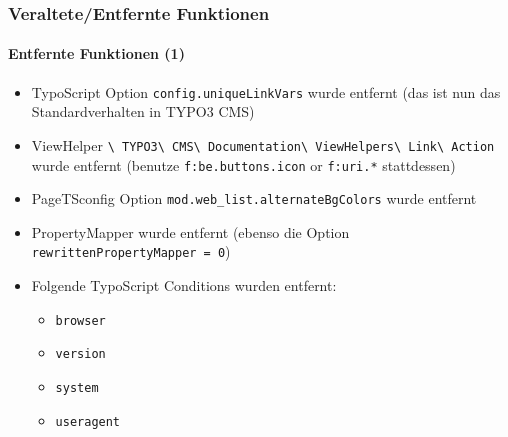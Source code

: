 \begin{frame}[fragile]
	\frametitle{Veraltete/Entfernte Funktionen}
	\framesubtitle{Entfernte Funktionen (1)}

	\begin{itemize}

		\item
			\small
				TypoScript Option \texttt{config.uniqueLinkVars} wurde entfernt\newline
				(das ist nun das Standardverhalten in TYPO3 CMS)
			\normalsize

		\item
			\small
				ViewHelper
					\texttt{\textbackslash
						TYPO3\textbackslash
						CMS\textbackslash
						Documentation\textbackslash
						ViewHelpers\textbackslash
						Link\textbackslash
						Action}
					wurde entfernt (benutze \texttt{f:be.buttons.icon} or \texttt{f:uri.*} stattdessen)
			\normalsize

		\item
			\small
				PageTSconfig Option \texttt{mod.web\_list.alternateBgColors}\newline
				wurde entfernt
			\normalsize

		\item
			\small
				PropertyMapper wurde entfernt\newline
				(ebenso die Option \texttt{rewrittenPropertyMapper = 0})
			\normalsize

		\item
			\small
				Folgende TypoScript Conditions wurden entfernt:

					\begin{itemize}
						\item\texttt{browser}
						\item\texttt{version}
						\item\texttt{system}
						\item\texttt{useragent}
					\end{itemize}
			\normalsize

	\end{itemize}

\end{frame}


